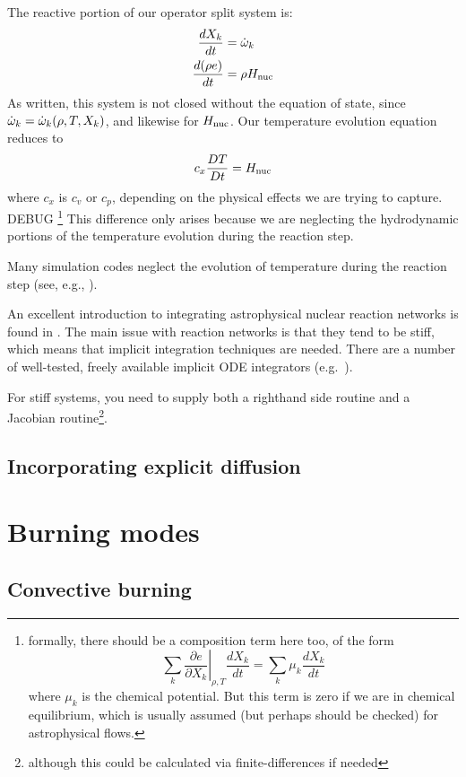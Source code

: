 The reactive portion of our operator split system is:
\begin{align}
\frac{dX_k}{dt} &= {\dot{\omega}}_k \\
\frac{d(\rho e)}{dt} &= \rho {H_\mathrm{nuc}}
\end{align}
As written, this system is not closed without the equation of state,
since ${\dot{\omega}}_k = {\dot{\omega}}_k(\rho, T, X_k)$, and likewise for
${H_\mathrm{nuc}}$.  Our temperature evolution equation reduces to
\begin{equation}
c_x {\frac{{DT}}{D t}} = {H_\mathrm{nuc}}
\end{equation}
where $c_x$ is $c_v$ or $c_p$, depending on the physical effects we are
trying to capture.
\if DEBUG
\footnote{formally, there should be a composition term here too, of the
form
\[
\sum_k \left . \frac{\partial e}{\partial X_k} \right |_{\rho,T} \frac{dX_k}{dt}  =
      \sum_k \mu_k \frac{dX_k}{dt} 
\]
where $\mu_k$ is the chemical potential.  But this term is zero if we
are in chemical equilibrium, which is usually assumed (but perhaps
should be checked) for astrophysical flows.  }
\fi
This difference only arises because we are neglecting the hydrodynamic
portions of the temperature evolution during the reaction step.

Many simulation codes neglect the evolution of temperature during the
reaction step (see, e.g., \cite{flash}).

An excellent introduction to integrating astrophysical nuclear
reaction networks is found in \cite{timmes_nets}.  The main issue with
reaction networks is that they tend to be stiff, which means that
implicit integration techniques are needed.  There are a number of
well-tested, freely available implicit ODE integrators
(e.g.~\cite{vode}).

For stiff systems, you need to supply both a righthand side routine
and a Jacobian routine\footnote{although this could be calculated via
  finite-differences if needed}.


\subsection{Incorporating explicit diffusion}



\section{Burning modes}


\subsection{Convective burning}


